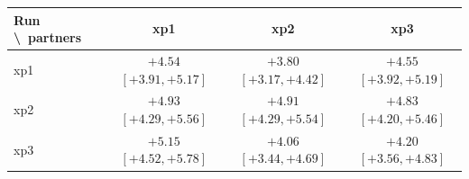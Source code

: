 \begin{tabular}{lccc}
\toprule
Run \textbackslash\ partners & xp1 & xp2 & xp3 \\
\midrule
xp1 & $+4.54$ $[+3.91, +5.17]$ & $+3.80$ $[+3.17, +4.42]$ & $+4.55$ $[+3.92, +5.19]$ \\
xp2 & $+4.93$ $[+4.29, +5.56]$ & $+4.91$ $[+4.29, +5.54]$ & $+4.83$ $[+4.20, +5.46]$ \\
xp3 & $+5.15$ $[+4.52, +5.78]$ & $+4.06$ $[+3.44, +4.69]$ & $+4.20$ $[+3.56, +4.83]$ \\
\bottomrule
\end{tabular}
